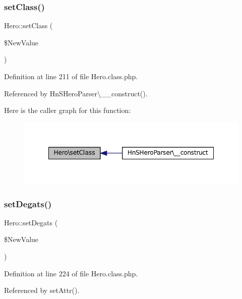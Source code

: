 \subsubsection{\texorpdfstring{set\+Class()}{setClass()}}
{\footnotesize\ttfamily Hero\+::set\+Class (\begin{DoxyParamCaption}\item[{}]{\$\+New\+Value }\end{DoxyParamCaption})}



Definition at line 211 of file Hero.\+class.\+php.



Referenced by Hn\+S\+Hero\+Parser\textbackslash{}\+\_\+\+\_\+construct().

Here is the caller graph for this function\+:\nopagebreak
\begin{figure}[H]
\begin{center}
\leavevmode
\includegraphics[width=348pt]{class_hero_a25f381160b165cd5e6210d7c6b86062f_icgraph}
\end{center}
\end{figure}
\mbox{\label{class_hero_a401e3a4a65354c605fa0958c725be87a}} 
\subsubsection{\texorpdfstring{set\+Degats()}{setDegats()}}
{\footnotesize\ttfamily Hero\+::set\+Degats (\begin{DoxyParamCaption}\item[{}]{\$\+New\+Value }\end{DoxyParamCaption})}



Definition at line 224 of file Hero.\+class.\+php.



Referenced by set\+Attr().

